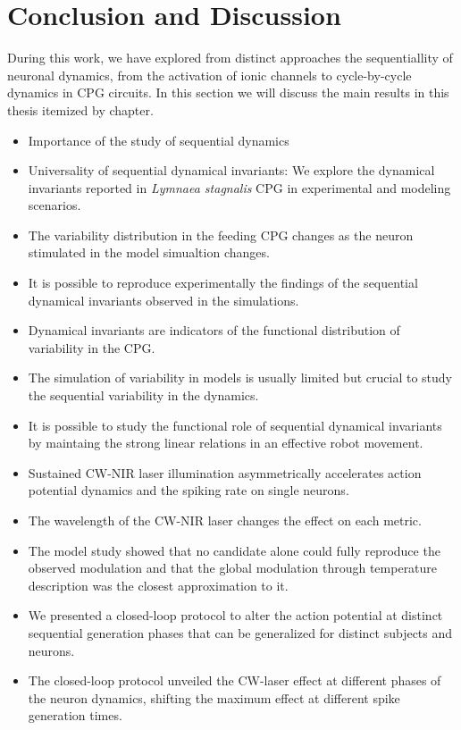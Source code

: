 \chapter{Conclusion and Discussion} %
\label{c-conclusion}

During this work, we have explored from distinct approaches the sequentiallity of neuronal dynamics, from the activation of ionic channels to cycle-by-cycle dynamics in CPG circuits. In this section we will discuss the main results in this thesis itemized by chapter. 

\begin{itemize}
	\item Importance of the study of sequential dynamics
	\item Universality of sequential dynamical invariants: We explore the dynamical invariants reported in \textit{Lymnaea stagnalis} CPG in experimental and modeling scenarios. 
	\item The variability distribution in the feeding CPG changes as the neuron stimulated in the model simualtion changes.
	\item It is possible to reproduce experimentally the findings of the sequential dynamical invariants observed in the simulations.
	\item Dynamical invariants are indicators of the functional distribution of variability in the CPG. 
	\item The simulation of variability in models is usually limited but crucial to study the sequential variability in the dynamics. 
	\item It is possible to study the functional role of sequential dynamical invariants by maintaing the strong linear relations in an effective robot movement.
	\item Sustained CW-NIR laser illumination asymmetrically accelerates action potential dynamics and the spiking rate on single neurons. 
	\item The wavelength of the CW-NIR laser changes the effect on each metric. 
	\item The model study showed that no candidate alone could fully reproduce the observed modulation and that the global modulation through temperature description was the closest approximation to it.
	\item We presented a closed-loop protocol to alter the action potential at distinct sequential generation phases that can be generalized for distinct subjects and neurons.
	\item The closed-loop protocol unveiled the CW-laser effect at different phases of the neuron dynamics, shifting the maximum effect at different spike generation times.
\end{itemize}


